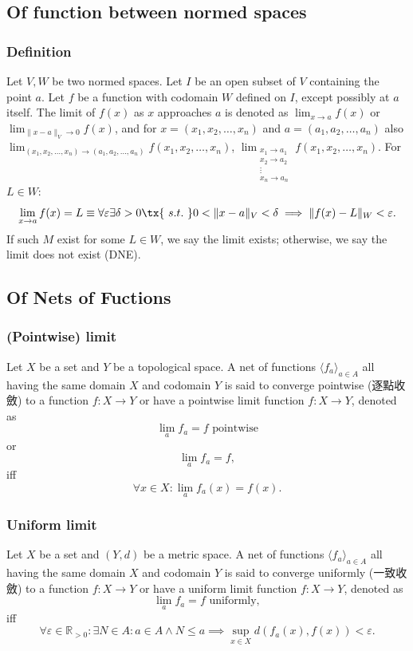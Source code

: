 \documentclass[a4paper,12pt]{report}
\begin{document}
\subsection{Of function between normed spaces}
\subsubsection{Definition}
Let $V,W$ be two normed spaces. Let $I$ be an open subset of $V$ containing the point $a$. Let $f$ be a function with codomain $W$ defined on $I$, except possibly at $a$ itself. The limit of $f(x)$ as $x$ approaches $a$ is denoted as $\lim_{x\to a}f(x)$ or $\lim_{\|x-a\|_V\to0}f(x)$, and for $x=(x_1,x_2,\ldots,x_n)$ and $a=(a_1,a_2,\ldots,a_n)$ also $\lim_{(x_1,x_2,\ldots,x_n)\to(a_1,a_2,\ldots,a_n)}f(x_1,x_2,\ldots,x_n)$, $\lim_{\substack{x_1\to a_1\\x_2\to a_2\\\vdots\\x_n\to a_n}}f(x_1,x_2,\ldots,x_n)$. For $L\in W$:
\[\lim_{x\to a}f(x)=L\equiv\forall\varepsilon\exists\delta>0\tx{\ s.t.\ }0<\|x-a\|_V<\delta\implies\|f(x)-L\|_W<\varepsilon.\]
If such $M$ exist for some $L\in W$, we say the limit exists; otherwise, we say the limit does not exist (DNE).
\subsection{Of Nets of Fuctions}
\subsubsection{(Pointwise) limit}
Let $X$ be a set and $Y$ be a topological space. A net of functions $\langle f_a\rangle_{a\in A}$ all having the same domain $X$ and codomain $Y$ is said to converge pointwise (逐點收斂) to a function $f\colon X\to Y$ or have a pointwise limit function $f\colon X\to Y$, denoted as 
\[\lim_af_a=f\text{\ pointwise}\]
or
\[\lim_af_a=f,\]
iff
\[\forall x\in X\colon\lim_af_a(x)=f(x).\]
\subsubsection{Uniform limit}
Let $X$ be a set and $(Y,d)$ be a metric space. A net of functions $\langle f_a\rangle_{a\in A}$ all having the same domain $X$ and codomain $Y$ is said to converge uniformly (一致收斂) to a function $f\colon X\to Y$ or have a uniform limit function $f\colon X\to Y$, denoted as 
\[\lim_af_a=f\text{\ uniformly},\]
iff
\[\forall\varepsilon\in\mathbb{R}_{>0}\colon\exists N\in A\colon a\in A\land N\leq a\implies\sup_{x\in X}d(f_a(x),f(x))<\varepsilon.\]
\end{document}
